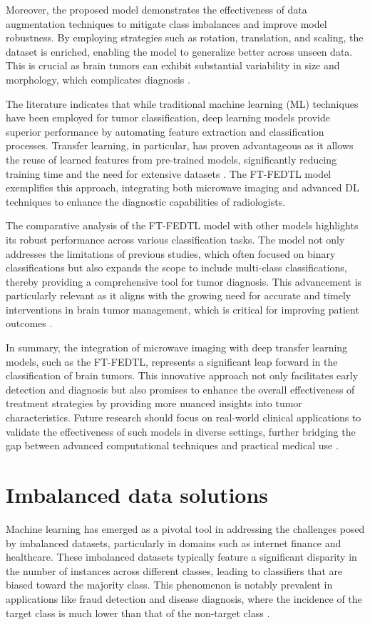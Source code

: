 \documentclass[runningheads]{llncs}
\begin{document}
Moreover, the proposed model demonstrates the effectiveness of data augmentation techniques to mitigate class imbalances and improve model robustness. By employing strategies such as rotation, translation, and scaling, the dataset is enriched, enabling the model to generalize better across unseen data. This is crucial as brain tumors can exhibit substantial variability in size and morphology, which complicates diagnosis \cite{Amran_2024}.

The literature indicates that while traditional machine learning (ML) techniques have been employed for tumor classification, deep learning models provide superior performance by automating feature extraction and classification processes. Transfer learning, in particular, has proven advantageous as it allows the reuse of learned features from pre-trained models, significantly reducing training time and the need for extensive datasets \cite{Amran_2024}. The FT-FEDTL model exemplifies this approach, integrating both microwave imaging and advanced DL techniques to enhance the diagnostic capabilities of radiologists.

The comparative analysis of the FT-FEDTL model with other models highlights its robust performance across various classification tasks. The model not only addresses the limitations of previous studies, which often focused on binary classifications but also expands the scope to include multi-class classifications, thereby providing a comprehensive tool for tumor diagnosis. This advancement is particularly relevant as it aligns with the growing need for accurate and timely interventions in brain tumor management, which is critical for improving patient outcomes \cite{Amran_2024}.

In summary, the integration of microwave imaging with deep transfer learning models, such as the FT-FEDTL, represents a significant leap forward in the classification of brain tumors. This innovative approach not only facilitates early detection and diagnosis but also promises to enhance the overall effectiveness of treatment strategies by providing more nuanced insights into tumor characteristics. Future research should focus on real-world clinical applications to validate the effectiveness of such models in diverse settings, further bridging the gap between advanced computational techniques and practical medical use \cite{Amran_2024}.
\section{Imbalanced data solutions}
Machine learning has emerged as a pivotal tool in addressing the challenges posed by imbalanced datasets, particularly in domains such as internet finance and healthcare. These imbalanced datasets typically feature a significant disparity in the number of instances across different classes, leading to classifiers that are biased toward the majority class. This phenomenon is notably prevalent in applications like fraud detection and disease diagnosis, where the incidence of the target class is much lower than that of the non-target class \cite{Misuk_2022}.
\end{document}
